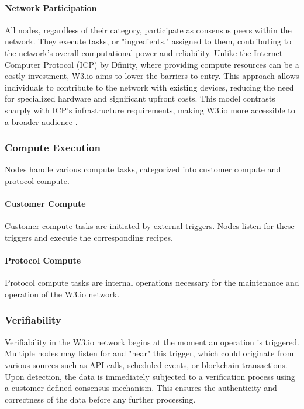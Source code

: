 \documentclass[11pt]{article}
\begin{document}
\paragraph{Network Participation}
All nodes, regardless of their category, participate as consensus peers within the network. They execute tasks, or "ingredients," assigned to them, contributing to the network's overall computational power and reliability. Unlike the Internet Computer Protocol (ICP) by Dfinity, where providing compute resources can be a costly investment, W3.io aims to lower the barriers to entry. This approach allows individuals to contribute to the network with existing devices, reducing the need for specialized hardware and significant upfront costs. This model contrasts sharply with ICP's infrastructure requirements, making W3.io more accessible to a broader audience \parencite{dfinity2018overview}.


\subsubsection{Compute Execution}
Nodes handle various compute tasks, categorized into customer compute and protocol compute.

\paragraph{Customer Compute}
Customer compute tasks are initiated by external triggers. Nodes listen for these triggers and execute the corresponding recipes.

\paragraph{Protocol Compute}
Protocol compute tasks are internal operations necessary for the maintenance and operation of the W3.io network.

\subsubsection{Verifiability}
Verifiability in the W3.io network begins at the moment an operation is triggered. Multiple nodes may listen for and "hear" this trigger, which could originate from various sources such as API calls, scheduled events, or blockchain transactions. Upon detection, the data is immediately subjected to a verification process using a customer-defined consensus mechanism. This ensures the authenticity and correctness of the data before any further processing.
\end{document}
